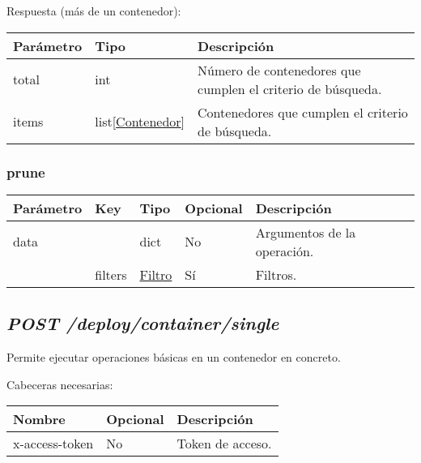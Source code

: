 			Respuesta (más de un contenedor):
			\begin{table}[h!]
				\centering
	\begin{adjustbox}{max width=\textwidth}
				\begin{tabularx}{\linewidth}{|l|l|L|}
					\hline
					Parámetro & Tipo & Descripción \\ \hline
					total & int & Número de contenedores que cumplen el criterio de búsqueda. \\ \hline
					items & list[\hyperref[sec:contenedor]{Contenedor}] & Contenedores que cumplen el criterio de búsqueda. \\ \hline
				\end{tabularx}
\end{adjustbox}
			\end{table}
	
	\pagebreak	
		\subsubsection{prune}
			\begin{table}[h!]
				\centering
	\begin{adjustbox}{max width=\textwidth}
				\begin{tabular}{|l|l|l|l|l|}
					\hline
					Parámetro & Key & Tipo & Opcional & Descripción \\ \hline
					data &  & dict & No & Argumentos de la operación. \\ \hline
					& filters & \hyperref[sec:filtrocontenedor]{Filtro} & Sí & Filtros. \\ \hline
				\end{tabular}
\end{adjustbox}
			\end{table}
	
	
	

	\subsection{\textit{POST /deploy/container/single}}
		Permite ejecutar operaciones básicas en un contenedor en concreto.
	
		Cabeceras necesarias:
		\begin{table}[h!]
			\centering
	\begin{adjustbox}{max width=\textwidth}
			\begin{tabular}{|l|l|l|}
				\hline
				Nombre & Opcional & Descripción \\ \hline
				x-access-token & No & Token de acceso. \\ \hline
			\end{tabular}
\end{adjustbox}
		\end{table}
		
